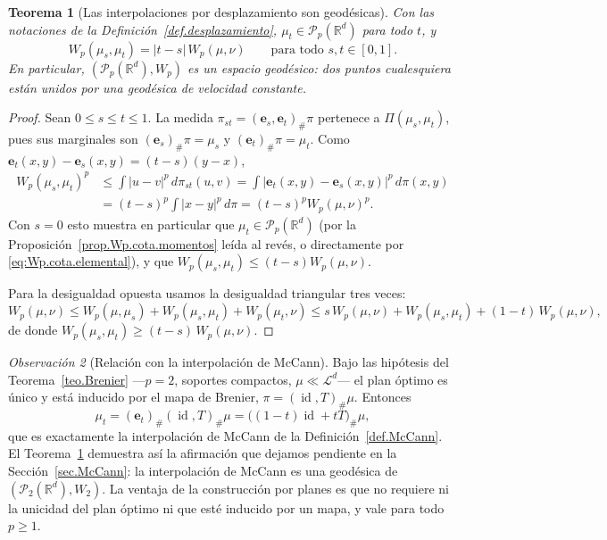 \documentclass[12pt, a4paper]{amsbook}
\newcommand{\id}{\operatorname{id}}
\newcommand{\R}{{\mathbb R}}
\newcommand{\ee}{{\mathbf e}}
\newtheorem{teo}{Teorema}[section]
\theoremstyle{remark}
\newtheorem{obs}[teo]{Observación}
\theoremstyle{definition}
\numberwithin{section}{chapter}
\numberwithin{subsection}{section}
\numberwithin{equation}{section}
\numberwithin{figure}{chapter}
\begin{document}
\begin{teo}[Las interpolaciones por desplazamiento son geodésicas]\label{teo.Wp.geodesica}
Con las notaciones de la Definición~\ref{def.desplazamiento}, $\mu_t\in\mathcal P_p(\R^d)$
para todo $t$, y
\[
W_p(\mu_s,\mu_t)=|t-s|\,W_p(\mu,\nu)
\qquad\text{para todo }s,t\in[0,1].
\]
En particular, $(\mathcal P_p(\R^d),W_p)$ es un espacio geodésico: dos puntos
cualesquiera están unidos por una geodésica de velocidad constante.
\end{teo}

\begin{proof}
Sean $0\le s\le t\le1$. La medida $\pi_{st}=(\ee_s,\ee_t)_\#\pi$ pertenece a
$\Pi(\mu_s,\mu_t)$, pues sus marginales son $(\ee_s)_\#\pi=\mu_s$ y
$(\ee_t)_\#\pi=\mu_t$. Como $\ee_t(x,y)-\ee_s(x,y)=(t-s)(y-x)$,
\[
\begin{aligned}
W_p(\mu_s,\mu_t)^p&\le\int|u-v|^p\,d\pi_{st}(u,v)
=\int|\ee_t(x,y)-\ee_s(x,y)|^p\,d\pi(x,y)\\
&=(t-s)^p\int|x-y|^p\,d\pi
=(t-s)^pW_p(\mu,\nu)^p.
\end{aligned}
\]
Con $s=0$ esto muestra en particular que $\mu_t\in\mathcal P_p(\R^d)$ (por la
Proposición~\ref{prop.Wp.cota.momentos} leída al revés, o directamente por
\eqref{eq:Wp.cota.elemental}), y que $W_p(\mu_s,\mu_t)\le(t-s)W_p(\mu,\nu)$.

Para la desigualdad opuesta usamos la desigualdad triangular tres veces:
\[
W_p(\mu,\nu)
\le W_p(\mu,\mu_s)+W_p(\mu_s,\mu_t)+W_p(\mu_t,\nu)
\le s\,W_p(\mu,\nu)+W_p(\mu_s,\mu_t)+(1-t)\,W_p(\mu,\nu),
\]
de donde $W_p(\mu_s,\mu_t)\ge(t-s)\,W_p(\mu,\nu)$.
\end{proof}

\begin{obs}[Relación con la interpolación de McCann]\label{obs.geodesica.McCann}
Bajo las hipótesis del Teorema~\ref{teo.Brenier} —$p=2$, soportes compactos,
$\mu\ll\mathcal L^d$— el plan óptimo es único y está inducido por el mapa de
Brenier, $\pi=(\id,T)_\#\mu$. Entonces
\[
\mu_t=(\ee_t)_\#(\id,T)_\#\mu=\bigl((1-t)\id+tT\bigr)_\#\mu,
\]
que es exactamente la interpolación de McCann de la
Definición~\ref{def.McCann}. El Teorema~\ref{teo.Wp.geodesica} demuestra así
la afirmación que dejamos pendiente en la Sección~\ref{sec.McCann}: la
interpolación de McCann es una geodésica de $(\mathcal P_2(\R^d),W_2)$. La
ventaja de la construcción por planes es que no requiere ni la unicidad del
plan óptimo ni que esté inducido por un mapa, y vale para todo $p\ge1$.
\end{obs}
\end{document}
